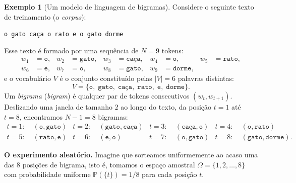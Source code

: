 \documentclass[12pt,portuguese]{article}
\theoremstyle{definition}
\newtheorem{example}[example]{Exemplo}
\begin{document}
\begin{example}[Um modelo de linguagem de bigramas]\label{ex:modelo-bigrama}
Considere o seguinte texto de treinamento (o \emph{corpus}):
\begin{center}
\texttt{o gato caça o rato e o gato dorme}
\end{center}
Esse texto é formado por uma sequência de $N=9$ tokens:
\begin{align*}
w_1&=\texttt{o}, & w_2&=\texttt{gato}, & w_3&=\texttt{caça}, & w_4&=\texttt{o}, & w_5&=\texttt{rato}, \\
w_6&=\texttt{e}, & w_7&=\texttt{o}, & w_8&=\texttt{gato}, & w_9&=\texttt{dorme},
\end{align*}
e o vocabulário $V$ é o conjunto constituído pelas $|V|=6$ palavras distintas:
\[
V=\{\texttt{o},\; \texttt{gato},\; \texttt{caça},\; \texttt{rato},\; \texttt{e},\; \texttt{dorme}\}.
\]
Um \emph{bigrama} (\emph{bigram}) é qualquer par de tokens consecutivos
$(w_t, w_{t+1})$. Deslizando uma janela de tamanho $2$ ao longo do texto, da
posição $t=1$ até $t=8$, encontramos $N-1=8$ bigramas:
\begin{align*}
t=1:\;&(\texttt{o}, \texttt{gato}) &
t=2:\;&(\texttt{gato}, \texttt{caça}) &
t=3:\;&(\texttt{caça}, \texttt{o}) &
t=4:\;&(\texttt{o}, \texttt{rato}) \\
t=5:\;&(\texttt{rato}, \texttt{e}) &
t=6:\;&(\texttt{e}, \texttt{o}) &
t=7:\;&(\texttt{o}, \texttt{gato}) &
t=8:\;&(\texttt{gato}, \texttt{dorme}).
\end{align*}

\textbf{O experimento aleatório.} Imagine que sorteamos uniformemente ao acaso
uma das $8$ posições de bigrama, isto é, tomamos o espaço amostral
$\Omega=\{1,2,\ldots,8\}$ com probabilidade uniforme $\mathbb{P}(\{t\})=1/8$
para cada posição $t$.


\end{example}
\end{document}
